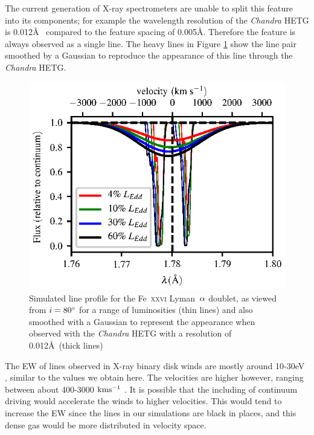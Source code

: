 \documentclass[a4paper,fleqn,usenatbib]{mnras}
\begin{document}
The current generation of X-ray spectrometers are unable to split this feature
into its components; for example the wavelength resolution of the \emph{Chandra}
HETG is 0.012\AA~ compared to the feature spacing of 0.005\AA.
 Therefore the feature is always observed as a single line. The heavy lines in Figure 
 \ref{figure:line26_smooth}
show the line pair smoothed by a Gaussian to reproduce the appearance of this line
through the \emph{Chandra} HETG. 


\begin{figure}
\includegraphics[width=\columnwidth]{figures/80_degrees_fe26_smooth.eps}
\caption{Simulated line profile for the Fe~\textsc{xxvi} Lyman~$\rm{\alpha}$
doublet, as viewed from $i = 80\degree$ for a range
of luminosities (thin lines) and also smoothed with a Gaussian to represent the appearance when
observed with the \emph{Chandra} HETG with a resolution of 0.012\AA~(thick lines)}
\label{figure:line26_smooth}
\end{figure}

The EW of lines observed in X-ray binary disk winds are mostly around 10-30eV 
\cite{2012MNRAS.422L..11P}, 
similar to the 
values we obtain here. The velocities are higher however, ranging between about 400-3000 $\rm{kms^{-1}}$
\cite{2016AN....337..368D}. It is possible that the including of continuum driving would accelerate the winds
to higher velocities. This would tend to increase the EW since the lines in our simulations are black in 
places, and this dense gas would be more distributed in velocity space. 
\end{document}
